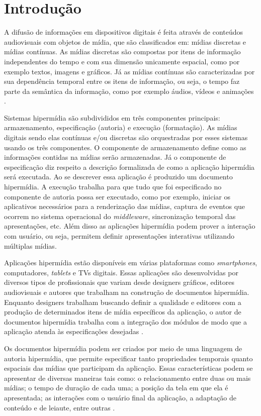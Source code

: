 \chapter{Introdução} \label{cap:cap1}

A difusão de informações em dispositivos digitais é feita através de conteúdos audiovisuais com objetos de mídia, que são classificados em: mídias discretas e mídias contínuas. As mídias discretas são compostas por itens de informação independentes do tempo e com sua dimensão unicamente espacial, como por exemplo textos, imagens e gráficos. Já as mídias contínuas são caracterizadas por sua dependência temporal entre os itens de informação, ou seja, o tempo faz parte da semântica da informação, como por exemplo áudios, vídeos e animações \cite{halsall2001multimedia}.

Sistemas hipermídia são subdivididos em três componentes principais: armazenamento, especificação (autoria) e execução (formatação). As mídias digitais sendo elas contínuas e/ou discretas são orquestradas por esses sistemas usando os três componentes. O componente de armazenamento define como as informações contidas na mídias serão armazenadas. Já o componente de especificação diz respeito a descrição formalizada de como a aplicação hipermídia será executada. Ao se descrever essa aplicação é produzido um documento hipermídia. A execução trabalha para que tudo que foi especificado no componente de autoria possa ser executado, como por exemplo, iniciar os aplicativos necessários para a renderização das mídias, captura de eventos que ocorrem no sistema operacional do \textit{middleware}, sincronização temporal das apresentações, etc. Além disso as aplicações hipermídia podem prover a interação com usuário, ou seja, permitem definir apresentações interativas utilizando múltiplas mídias. 

Aplicações hipermídia estão disponíveis em várias plataformas como \textit{smartphones}, computadores, \textit{tablets} e TVs digitais. Essas aplicações são desenvolvidas por diversos tipos de profissionais que variam desde designers gráficos, editores audiovisuais e autores que trabalham na construção de documentos hipermídia. Enquanto designers trabalham buscando definir a qualidade e editores com a produção de determinados itens de mídia específicos da aplicação, o autor de documentos hipermídia trabalha com a integração dos módulos de modo que a aplicação atenda às especificações desejadas \cite{soares2000modeling}.

Os documentos hipermídia podem ser criados por meio de uma linguagem de autoria hipermídia, que permite especificar tanto propriedades temporais quanto espaciais das mídias que participam da aplicação. Essas características podem se apresentar de diversas maneiras tais como: o relacionamento entre duas ou mais mídias; o tempo de duração de cada uma; a posição da tela em que ela é apresentada; as interações com o usuário final da aplicação, a adaptação de conteúdo e de leiaute, entre outras \cite{soares2000modeling,barreto2016ncl}.

